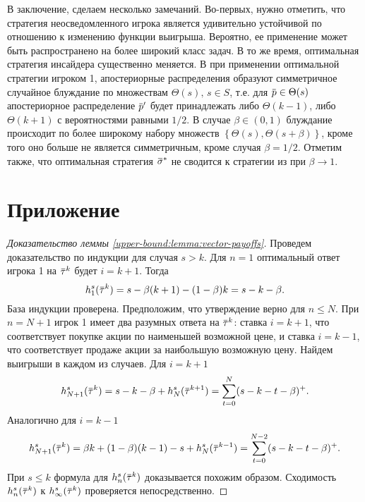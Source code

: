 \documentclass[12pt, draft]{extarticle}
\newcommand{\overbar}[1]%
{\mkern 1.5mu\overline{\mkern-1.3mu#1\mkern-1.3mu}\mkern 1.3mu}
\newcommand{\p}{\ensuremath{\overbar{p}}}
\newcommand{\sigmav}{\ensuremath{\overbar{\sigma}}}
\newcommand{\tauv}{\ensuremath{\overbar{\tau}}}
\begin{document}
В заключение, сделаем несколько замечаний. Во-первых, нужно отметить, что
стратегия неосведомленного игрока является удивительно устойчивой по отношению к
изменению функции выигрыша. Вероятно, ее применение может быть распространено на
более широкий класс задач. В то же время, оптимальная стратегия инсайдера
существенно меняется. В \cite{bib:domansky11} при применении оптимальной
стратегии игроком 1, апостериорные распределения образуют симметричное случайное
блуждание по множествам $\Theta(s), \, s \in S$, т.е. для $\p \in \Theta(s)$
апостериорное распределение $\p'$ будет принадлежать либо $\Theta(k-1)$, либо
$\Theta(k+1)$ с вероятностями равными $1/2$. В случае $\beta \in (0, 1)$
блуждание происходит по более широкому набору множеств %
$\left\{ \Theta(s), \Theta(s+\beta) \right\}$, %
кроме того оно больше не является симметричным, кроме случая $\beta = 1/2$.
Отметим также, что оптимальная стратегия $\sigmav^*$ не сводится к стратегии из
\cite{bib:domansky11} при $\beta \rightarrow 1$.

\appendix
\setcounter{secnumdepth}{0}
\section{Приложение}

\begin{proof}[Доказательство леммы \ref{upper-bound:lemma:vector-payoffs}]
  Проведем доказательство по индукции для случая $s > k$. Для $n = 1$
  оптимальный ответ игрока 1 на $\tauv^k$ будет $i = k + 1$. Тогда
  \begin{equation*}
    h^s_1(\tauv^k) = s - \beta(k+1) - (1-\beta)k = s - k - \beta.
  \end{equation*}
  База индукции проверена. Предположим, что утверждение верно для $n \leqslant
  N$. При $n = N + 1$ игрок 1 имеет два разумных ответа на $\tauv^k$: ставка $i
  = k + 1$, что соответствует покупке акции по наименьшей возможной цене, и
  ставка $i = k - 1$, что соответствует продаже акции за наибольшую возможную
  цену. Найдем выигрыши в каждом из случаев. Для $i = k + 1$
  \begin{equation*}
    h^s_{N+1}(\tauv^k) = s - k - \beta + h^s_N(\tauv^{k+1}) =
    \sum_{t=0}^N(s-k-t-\beta)^+.
  \end{equation*}
  Аналогично для $i = k - 1$
  \begin{equation*}
    h^s_{N+1}(\tauv^k) = \beta k + (1-\beta)(k-1) - s + h^s_N(\tauv^{k-1}) =
    \sum_{t=0}^{N-2}(s-k-t-\beta)^+.
  \end{equation*}
  При $s \leqslant k$ формула для $h^s_n(\tauv^k)$ доказывается похожим образом.
  Сходимость $h^s_n(\tauv^k)$ к $h^s_\infty(\tauv^k)$ проверяется
  непосредственно.
\end{proof}
\end{document}
